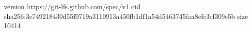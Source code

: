 version https://git-lfs.github.com/spec/v1
oid sha256:3e749218430d55f0719a3110913a450fb1df1a54d5463745faa8efc3cf309c5b
size 10414
